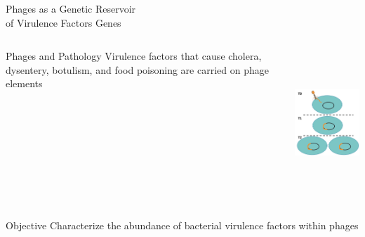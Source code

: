 \documentclass[11pt, xcolor=table]{beamer}
\begin{document}
	
	
	\begin{frame}{Phages as a Genetic Reservoir \\ of Virulence Factors Genes}
	\begin{columns}
	\vspace{-1cm}
	\begin{block}{Phages and Pathology}
	Virulence factors that cause cholera, dysentery, botulism, and food poisoning are carried on phage elements
	\end{block}
	
	\includegraphics[height=5.5cm, width=5cm]{CPBS_11_18/lysogeny.jpg} \\
	\hspace{0.5cm}	
	\end{columns}
	\vspace{-1cm}
	\begin{block}{Objective}
	Characterize the abundance of bacterial virulence factors within phages
	\end{block}
	
	\end{frame}
\end{document}
